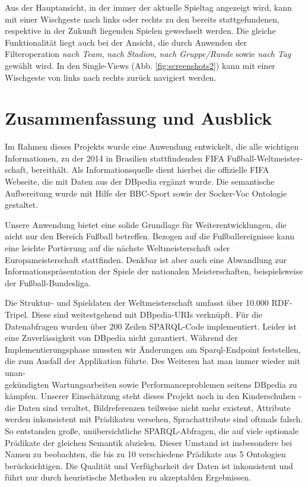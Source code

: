 \documentclass[runningheads,a4paper]{llncs}
\begin{document}
Aus der Hauptansicht, in der immer der aktuelle Spieltag angezeigt wird, kann mit einer Wischgeste nach links oder rechts zu den bereits stattgefundenen, respektive in der Zukunft liegenden Spielen gewechselt werden. Die gleiche Funktionalität liegt auch bei der Ansicht, die durch Anwenden der Filteroperation \textit{nach Team}, \textit{nach Stadion}, \textit{nach Gruppe/Runde} sowie \textit{nach Tag} gewählt wird.
In den Single-Views (Abb. \ref{fig:screenshots2}) kann mit einer Wischgeste von links nach rechts zurück navigiert werden.

\newpage

\section{Zusammenfassung und Ausblick}

Im Rahmen dieses Projekts wurde eine Anwendung entwickelt, die alle wichtigen Informationen, zu der 2014 in Brasilien stattfindenden FIFA Fußball-Weltmeister-schaft, bereithält. Als Informationsquelle dient hierbei die offizielle FIFA Webseite, die mit Daten aus der DBpedia ergänzt wurde. Die semantische Aufbereitung wurde mit Hilfe der BBC-Sport sowie der Socker-Voc Ontologie gestaltet.  

Unsere Anwendung bietet eine solide Grundlage für Weiterentwicklungen, die nicht nur den Bereich Fußball betreffen. Bezogen auf die Fußballereignisse kann eine leichte Portierung auf die nächste Weltmeisterschaft oder Europameisterschaft stattfinden. Denkbar ist aber auch eine Abwandlung zur Informationspräsentation der Spiele der nationalen Meisterschaften, beispielsweise der Fußball-Bundesliga.

Die Struktur- und Spieldaten der Weltmeisterschaft umfasst über 10.000 RDF-Tripel. Diese sind weitestgehend mit DBpedia-URIs verknüpft. Für die Datenabfragen wurden über 200 Zeilen SPARQL-Code implementiert. Leider ist eine Zuverlässigkeit von DBpedia nicht garantiert. Während der Implementierungsphase mussten wir Änderungen am Sparql-Endpoint feststellen, die zum Ausfall der Applikation führte. Des Weiteren hat man immer wieder mit unan-\\ gekündigten Wartungsarbeiten sowie Performanceproblemen seitens DBpedia zu kämpfen. Unserer Einschätzung steht dieses Projekt noch in den Kinderschuhen - die Daten sind veraltet, Bildreferenzen teilweise nicht mehr existent, Attribute werden inkonsistent mit Prädikaten versehen, Sprachattribute sind oftmals falsch. So entstanden große, unübersichtliche SPARQL-Abfragen, die auf viele optionale Prädikate der gleichen Semantik abzielen. Dieser Umstand ist insbesondere bei Namen zu beobachten, die bis zu 10 verschiedene Prädikate aus 5 Ontologien berücksichtigen. Die Qualität und Verfügbarkeit der Daten ist inkonsistent und führt nur durch heuristische Methoden zu akzeptablen Ergebnissen.
\end{document}
